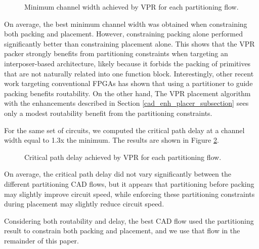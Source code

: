 \begin{figure}[!htbp]
\centering

\caption{Minimum channel width achieved by VPR for each partitioning flow.}
\label{fig:flows_mcw}
\end{figure}

On average, the best minimum channel width was obtained when constraining both packing and placement. However, constraining packing alone performed significantly better than constraining placement alone. This shows that the VPR packer strongly benefits from partitioning constraints when targeting an interposer-based architecture, likely because it forbids the packing of primitives that are not naturally related into one function block. Interestingly, other recent work targeting conventional FPGAs has shown that using a partitioner to guide packing benefits routability\cite{feng2014rent}. On the other hand, The VPR placement algorithm with the enhancements described in Section \ref{cad_enh_placer_subsection} sees only a modest routability benefit from the partitioning constraints.

For the same set of circuits, we computed the critical path delay at a channel width equal to 1.3x the minimum. The results are shown in Figure \ref{fig:flows_crit_path}.

\begin{figure}[!htbp]
\centering

\caption{Critical path delay achieved by VPR for each partitioning flow.}
\label{fig:flows_crit_path}
\end{figure}

On average, the critical path delay did not vary significantly between the different partitioning CAD flows, but it appears that partitioning before packing may slightly improve circuit speed, while enforcing these partitioning constraints during placement may slightly reduce circuit speed.

Considering both routability and delay, the best CAD flow used the partitioning result to constrain both packing and placement, and we use that flow in the remainder of this paper.

